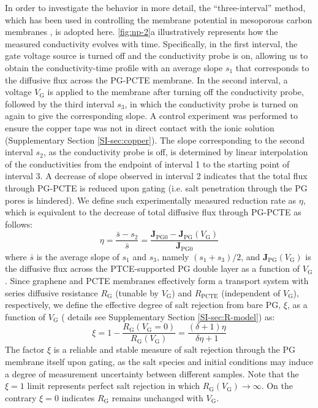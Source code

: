 In order to investigate the behavior in more detail, the ``three-interval'' method, which has been used
in controlling the membrane potential in mesoporous carbon membranes
\cite{Surwade_2014_carbon_electrochemical_ion}, is adopted here.  \autoref{fig:np-2}a
illustratively represents how the measured conductivity evolves with
time. Specifically, in the first interval, the gate voltage source is
turned off and the conductivity probe is on, allowing us to obtain the
conductivity-time profile with an average slope $s_{1}$ that
corresponds to the diffusive flux across the PG-PCTE membrane. In the
second interval, a voltage $V_{\mathrm{G}}$ is applied to the membrane
after turning off the conductivity probe, followed by the third
interval $s_{3}$, in which the conductivity probe is turned on again
to give the corresponding slope. A control experiment was performed to
ensure the copper tape was not in direct contact with the ionic
solution (Supplementary Section \autoref{SI-sec:copper}). The slope
corresponding to the second interval $s_{2}$, as the conductivity
probe is off, is determined by linear interpolation of the
conductivities from the endpoint of interval 1 to the starting point
of interval 3. A decrease of slope observed in interval 2 indicates
that the total flux through PG-PCTE is reduced upon gating (i.e. salt
penetration through the PG pores is hindered). We define such
experimentally measured reduction rate as $\eta$, which is equivalent
to the decrease of total diffusive flux through PG-PCTE as follows:
\begin{equation}
  \label{eq:np-rejection}
  \eta = \frac{\bar{s} - s_{2}}{\bar{s}} = \frac{\boldsymbol{J}_{\mathrm{PG0}}
    - \boldsymbol{J}_{\mathrm{PG}}(V_{\mathrm{G}})}{\boldsymbol{J}_{\mathrm{PG0}}}
\end{equation}
where $\bar{s}$ is the average slope of $s_{1}$ and $s_{3}$, namely
$(s_{1} + s_{3})/2$, and
$\boldsymbol{J}_{\mathrm{PG}}(V_{\mathrm{G}})$ is the diffusive flux
across the PTCE-supported PG double layer as a function of
$V_{\mathrm{G}}$. Since graphene and PCTE membranes effectively form a
transport system with series diffusive resistance $R_{\mathrm{G}}$
(tunable by $V_{\mathrm{G}}$) and $R_{\mathrm{PCTE}}$ (independent of
$V_{\mathrm{G}}$), respectively, we define the effective degree of
salt rejection from bare PG, $\xi$, as a function of $V_{\mathrm{G}}$ (
details see Supplementary Section \autoref{SI-sec:R-model}) as:
\begin{equation}
\label{eq:np-xi-def}
\xi = 1 - \frac{R_{\mathrm{G}}(V_{\mathrm{G}}=0)}{R_{\mathrm{G}}(V_{\mathrm{G}})} = \frac{(\delta+1) \eta}{\delta \eta + 1}
\end{equation}
The factor $\xi$ is a reliable and stable measure of salt rejection
through the PG membrane itself upon gating, as the salt species and
initial conditions may induce a degree of measurement uncertainty
between different samples. Note that the $\xi=1$ limit represents
perfect salt rejection in which
$R_{\mathrm{G}}(V_{\mathrm{G}}) \to \infty$. On the contrary $\xi=0$
indicates $R_{\mathrm{G}}$ remains unchanged with $V_{\mathrm{G}}$.

